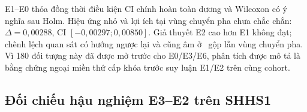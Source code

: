\begin{table}[H]
\centering
\caption{Hiệu năng mô tả trong phân tích thành phần SHHS1}
\label{tab:shhs_component_descriptive}
\end{table}

\begin{table}[H]
\centering
\caption{So sánh bắt cặp trong phân tích thành phần SHHS1}
\label{tab:shhs_component_comparisons}
\end{table}

E1--E0 thỏa đồng thời điều kiện CI chính hoàn toàn dương và Wilcoxon có ý nghĩa sau Holm. Hiệu ứng nhỏ và lợi ích tại vùng chuyển pha chưa chắc chắn: $\Delta=0,00288$, CI $[-0,00297;0,00850]$. Giả thuyết E2 cao hơn E1 không đạt; chênh lệch quan sát có hướng ngược lại và cũng âm ở \mf\ gộp lẫn vùng chuyển pha. Vì 180 đối tượng này đã được mở trước cho E0/E3/E6, phân tích được mô tả là bằng chứng ngoại miền thứ cấp khóa trước suy luận E1/E2 trên cùng cohort.

\subsection{Đối chiếu hậu nghiệm E3--E2 trên SHHS1}

